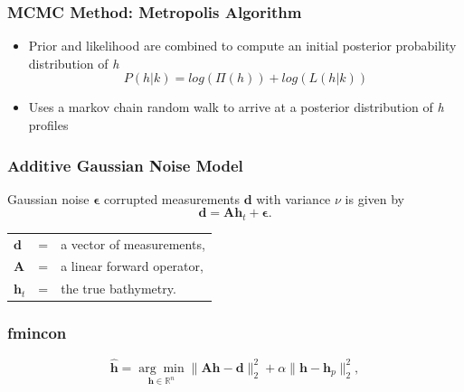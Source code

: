 \documentclass[7pt]{beamer}
\begin{document}
\begin{frame}
 \frametitle{MCMC Method: Metropolis Algorithm}
\begin{itemize}
\item Prior and likelihood are combined to compute an initial posterior probability distribution of \textit{h}\\
\begin{equation}\label{post}
P(h|%
k) = log(\Pi(h)) + log(L(h|%
k))
\end{equation}
\item Uses a markov chain random walk to %
arrive at a posterior distribution of \textit{h} profiles %
\end{itemize}
\end{frame}

 \begin{frame}
\frametitle{Additive Gaussian Noise Model}

Gaussian noise $\boldsymbol{\epsilon}$ corrupted measurements $\mathbf{d}$ with variance $\nu$ is given by 
$$
\mathbf{d} = \mathbf{A} \mathbf{h}_t + \boldsymbol{\epsilon}.
$$

\begin{tabular}{l c l}
$\mathbf{d}$ &=& a vector of measurements,\\
$\mathbf{A}$ &=& a linear forward operator,\\
$\mathbf{h}_t$ &=& the true bathymetry. 
\end{tabular}

\end{frame}


 \begin{frame}
\frametitle{fmincon}
$$
\mathbf{\hat{h}} = \underset{\mathbf{h} \in \mathbb{R}^n}{\arg \min} \|  \mathbf{A}\mathbf{h} -  \mathbf{d} \|_2^2  +  \alpha \| \mathbf{h} -  \mathbf{h}_p\|_2^2,
$$



\end{frame}
\end{document}
